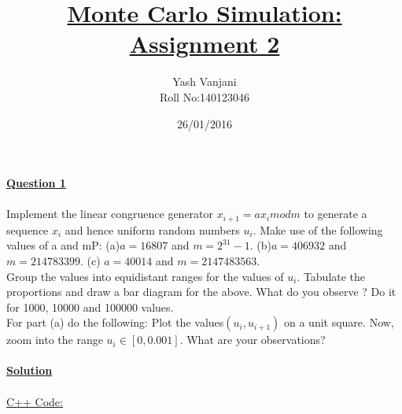 \documentclass[11pt]{article}
\title{\Huge{\textbf{\underline{Monte Carlo Simulation: Assignment 2}}}}
\author{Yash Vanjani\\
		Roll No:140123046\\
		}
\date{26/01/2016}
\begin{document}
\maketitle
\Large{\textbf{\underline{Question 1}}}\\\\
Implement the linear congruence generator $x_{i+1}=ax_i mod m$ to generate a sequence $x_i$ and hence uniform random numbers $u_i$. Make use of the following values of a and mP: (a)$a=16807$ and $m=2^{31}-1$. (b)$a=406932$ and $m=214783399$. (c) $a=40014$ and $m=2147483563$.\\
Group the values into equidistant ranges for the values of $u_i$. Tabulate the proportions
and draw a bar diagram for the above. What do you observe ? Do it for 1000, 10000
and 100000 values.\\
For part (a) do the following: Plot the values$(u_i,u_{i+1})$ on a unit square. Now, zoom into the range $u_i\in[0,0.001]$. What are your observations?\\\\
\Large{\textbf{\underline{Solution}}}\\\\
\underline{C++ Code:}
\end{document}
